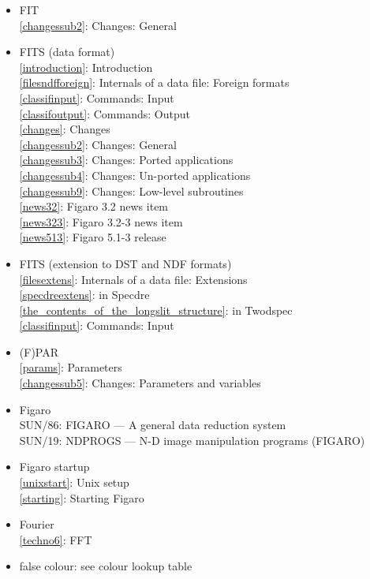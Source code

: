 \documentclass[11pt,twoside]{article}
\newcommand{\htmlref}[2]{#1}
\newcommand{\xref}[3]{#1}
\newcommand{\idxint}[2]{\ref{#1}: \htmlref{#2}{#1}}
\newcommand{\idxint}[2]{\htmlref{#2}{#1}}
\newcommand{\latorhtm}[2]{#1}
\newcommand{\latorhtm}[2]{#2}
\begin{document}
\begin{itemize}
\item FIT\\
   \idxint{changessub2}{Changes: General}
\item FITS (data format)\\
   \idxint{introduction}{Introduction}\\
   \idxint{filesndfforeign}{Internals of a data file: Foreign formats}\\
   \idxint{classifinput}{Commands: Input}\\
   \idxint{classifoutput}{Commands: Output}\\
   \idxint{changes}{Changes}\\
   \idxint{changessub2}{Changes: General}\\
   \idxint{changessub3}{Changes: Ported applications}\\
   \idxint{changessub4}{Changes: Un-ported applications}\\
   \idxint{changessub9}{Changes: Low-level subroutines}\\
   \idxint{news32}{Figaro 3.2 news item}\\
   \idxint{news323}{Figaro 3.2-3 news item}\\
   \idxint{news513}{Figaro 5.1-3 release}
\item FITS (extension to DST and NDF formats)\\
   \idxint{filesextens}{Internals of a data file: Extensions}\\
   \idxint{specdreextens}{in Specdre}\\
   \idxint{the_contents_of_the_longslit_structure}{in Twodspec}\\
   \idxint{classifinput}{Commands: Input}
\item (F)PAR\\
   \idxint{params}{Parameters}\\
   \idxint{changessub5}{Changes: Parameters and variables}
\item Figaro\\
   SUN/86: FIGARO \latorhtm{---}{-} A general data reduction system\\
   \xref{SUN/19: NDPROGS \latorhtm{---}{-} N-D image manipulation programs (FIGARO)}{sun19}{}
\item Figaro startup\\
   \idxint{unixstart}{Unix setup}\\
   \idxint{starting}{Starting Figaro}
\item Fourier\\
   \idxint{techno6}{FFT}
\item false colour: see colour lookup table

\end{itemize}
\end{document}
